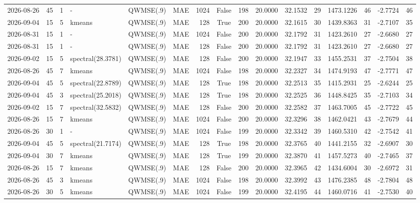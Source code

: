 \documentclass[10pt]{article}
\begin{document}
\begin{landscape}
\begin{longtable}{@{}lrrlllrcrrrrrrrr@{}}
2026-08-26 & 45 & 1 & - & QWMSE(.9) & MAE & 1024 & False & 198 & 20.0000 & 32.1532 & 29 & 1473.1226 & 46 & -2.7724 & 46 \\
2026-09-04 & 15 & 5 & kmeans & QWMSE(.9) & MAE & 128 & True & 200 & 20.0000 & 32.1615 & 30 & 1439.8363 & 31 & -2.7107 & 35 \\
2026-08-31 & 15 & 1 & - & QWMSE(.9) & MAE & 1024 & False & 200 & 20.0000 & 32.1792 & 31 & 1423.2610 & 27 & -2.6680 & 27 \\
2026-08-31 & 15 & 1 & - & QWMSE(.9) & MAE & 128 & False & 200 & 20.0000 & 32.1792 & 31 & 1423.2610 & 27 & -2.6680 & 27 \\
2026-09-02 & 15 & 5 & spectral(28.3781) & QWMSE(.9) & MAE & 128 & False & 200 & 20.0000 & 32.1947 & 33 & 1455.2531 & 37 & -2.7504 & 38 \\
2026-08-26 & 45 & 7 & kmeans & QWMSE(.9) & MAE & 1024 & False & 198 & 20.0000 & 32.2327 & 34 & 1474.9193 & 47 & -2.7771 & 47 \\
2026-09-04 & 45 & 5 & spectral(22.8789) & QWMSE(.9) & MAE & 128 & True & 198 & 20.0000 & 32.2513 & 35 & 1415.2931 & 25 & -2.6244 & 25 \\
2026-09-04 & 45 & 3 & spectral(25.2018) & QWMSE(.9) & MAE & 128 & True & 198 & 20.0000 & 32.2525 & 36 & 1448.8425 & 35 & -2.7103 & 34 \\
2026-09-02 & 15 & 7 & spectral(32.5832) & QWMSE(.9) & MAE & 128 & False & 200 & 20.0000 & 32.2582 & 37 & 1463.7005 & 45 & -2.7722 & 45 \\
2026-08-26 & 15 & 7 & kmeans & QWMSE(.9) & MAE & 1024 & False & 200 & 20.0000 & 32.3296 & 38 & 1462.0421 & 43 & -2.7679 & 44 \\
2026-08-26 & 30 & 1 & - & QWMSE(.9) & MAE & 1024 & False & 199 & 20.0000 & 32.3342 & 39 & 1460.5310 & 42 & -2.7542 & 41 \\
2026-09-04 & 45 & 5 & spectral(21.7174) & QWMSE(.9) & MAE & 128 & True & 198 & 20.0000 & 32.3765 & 40 & 1441.2155 & 32 & -2.6907 & 30 \\
2026-09-04 & 30 & 7 & kmeans & QWMSE(.9) & MAE & 128 & True & 199 & 20.0000 & 32.3870 & 41 & 1457.5273 & 40 & -2.7465 & 37 \\
2026-08-26 & 15 & 7 & kmeans & QWMSE(.9) & MAE & 128 & False & 200 & 20.0000 & 32.3965 & 42 & 1434.6004 & 30 & -2.6972 & 31 \\
2026-08-26 & 45 & 3 & kmeans & QWMSE(.9) & MAE & 1024 & False & 198 & 20.0000 & 32.3992 & 43 & 1476.2385 & 48 & -2.7804 & 48 \\
2026-08-26 & 30 & 5 & kmeans & QWMSE(.9) & MAE & 1024 & False & 199 & 20.0000 & 32.4195 & 44 & 1460.0716 & 41 & -2.7530 & 40 \\

\end{longtable}
\end{landscape}
\end{document}
